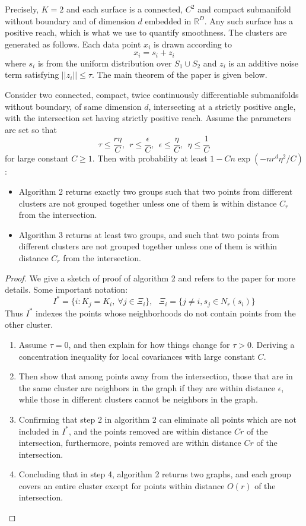 \documentclass[twoside,11pt]{article}
\begin{document}
Precisely, $K=2$ and each surface is a connected, $C^2$ and compact submanifold without boundary and of dimension $d$ embedded in $\mathbb R^D$.
Any such surface has a positive reach, which is what we use to quantify smoothness.
The clusters are generated as follows.
Each data point $x_i$ is drawn according to
$$ x_i = s_i + z_i $$
where $s_i$ is from the uniform distribution over
$S_1\cup S_2$ and $z_i$
is an additive noise term satisfying $||z_i||\le \tau$.
The main theorem of the paper is given below.
\begin{theorem}
Consider two connected, compact, twice continuously differentiable submanifolds
without boundary, of same dimension \(d\), intersecting at a strictly positive angle, with the intersection set having strictly positive reach.
Assume the parameters are set so that
$$
\tau\le \frac{r\eta}{C},\ \ r\le\frac{\epsilon}{C},\ \ \epsilon\le\frac{\eta}{C},\ \ \eta\le\frac{1}{C}
$$
for large constant $C\ge 1$.
Then with probability at least $1-Cn\exp(- nr^d\eta^2/C)$:
\begin{itemize}
\item Algorithm 2 returns exactly two groups such that two points from different clusters are not grouped together unless one of them is within distance \(C_r\) from the intersection.
\item Algorithm 3 returns at least two groups, and such that two points from different clusters are not grouped together unless one of them is within distance \(C_r\) from the intersection.
\end{itemize}
\end{theorem}

\begin{proof}
We give a sketch of proof of algorithm 2 and refers to the paper for more details. Some important notation:
$$
I^*=\{i: K_j=K_i,\ \forall j\in\Xi_i  \},\ \ \ \Xi_i=\{j\ne i, s_j\in N_r(s_i)   \}
$$
Thus $I^*$ indexes the points whose neighborhoods do not contain points from the other cluster.
\begin{enumerate}
\item Assume $\tau=0$, and then explain for how things change for $\tau>0$. Deriving a concentration inequality for local covariances with large constant $C$.
\item Then show that among points away from the intersection, those that are in the same cluster are neighbors in the graph if they are within distance $\epsilon$, while those in different clusters cannot be neighbors in the graph.
\item Confirming that step 2 in algorithm 2 can eliminate all points which are not included in $I^*$, and  the points removed are within distance $Cr$ of the intersection, furthermore,  points removed are within distance $Cr$ of the intersection.
\item Concluding that in step 4, algorithm 2 returns two graphs, and each group covers an entire cluster except for points within distance $O(r)$ of the intersection.
\end{enumerate}
\end{proof}
\end{document}
